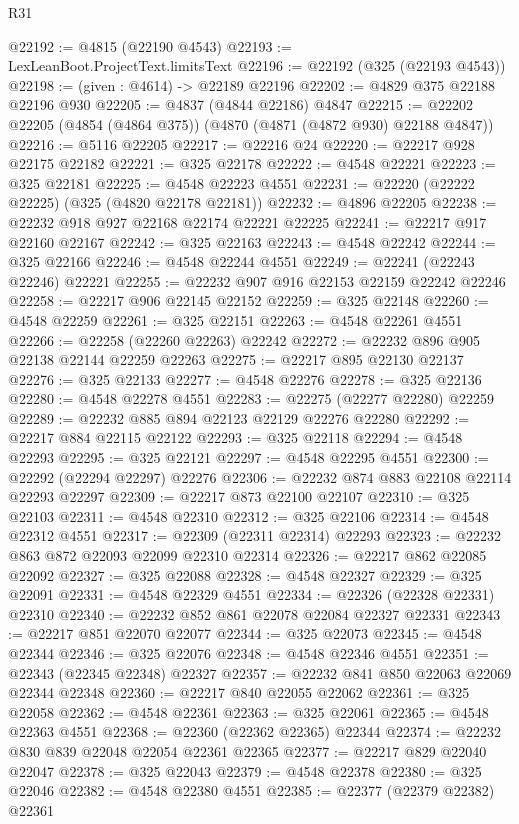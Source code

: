 \begin{lexlean}{R31}
\begin{coremodule}
@22192 := @4815 (@22190 @4543)
@22193 := LexLeanBoot.ProjectText.limitsText
@22196 := @22192 (@325 (@22193 @4543))
@22198 := (given : @4614) -> @22189 @22196
@22202 := @4829 @375 @22188 @22196 @930
@22205 := @4837 (@4844 @22186) @4847
@22215 := @22202 @22205 (@4854 (@4864 @375)) (@4870 (@4871 (@4872 @930) @22188 @4847))
@22216 := @5116 @22205
@22217 := @22216 @24
@22220 := @22217 @928 @22175 @22182
@22221 := @325 @22178
@22222 := @4548 @22221
@22223 := @325 @22181
@22225 := @4548 @22223 @4551
@22231 := @22220 (@22222 @22225) (@325 (@4820 @22178 @22181))
@22232 := @4896 @22205
@22238 := @22232 @918 @927 @22168 @22174 @22221 @22225
@22241 := @22217 @917 @22160 @22167
@22242 := @325 @22163
@22243 := @4548 @22242
@22244 := @325 @22166
@22246 := @4548 @22244 @4551
@22249 := @22241 (@22243 @22246) @22221
@22255 := @22232 @907 @916 @22153 @22159 @22242 @22246
@22258 := @22217 @906 @22145 @22152
@22259 := @325 @22148
@22260 := @4548 @22259
@22261 := @325 @22151
@22263 := @4548 @22261 @4551
@22266 := @22258 (@22260 @22263) @22242
@22272 := @22232 @896 @905 @22138 @22144 @22259 @22263
@22275 := @22217 @895 @22130 @22137
@22276 := @325 @22133
@22277 := @4548 @22276
@22278 := @325 @22136
@22280 := @4548 @22278 @4551
@22283 := @22275 (@22277 @22280) @22259
@22289 := @22232 @885 @894 @22123 @22129 @22276 @22280
@22292 := @22217 @884 @22115 @22122
@22293 := @325 @22118
@22294 := @4548 @22293
@22295 := @325 @22121
@22297 := @4548 @22295 @4551
@22300 := @22292 (@22294 @22297) @22276
@22306 := @22232 @874 @883 @22108 @22114 @22293 @22297
@22309 := @22217 @873 @22100 @22107
@22310 := @325 @22103
@22311 := @4548 @22310
@22312 := @325 @22106
@22314 := @4548 @22312 @4551
@22317 := @22309 (@22311 @22314) @22293
@22323 := @22232 @863 @872 @22093 @22099 @22310 @22314
@22326 := @22217 @862 @22085 @22092
@22327 := @325 @22088
@22328 := @4548 @22327
@22329 := @325 @22091
@22331 := @4548 @22329 @4551
@22334 := @22326 (@22328 @22331) @22310
@22340 := @22232 @852 @861 @22078 @22084 @22327 @22331
@22343 := @22217 @851 @22070 @22077
@22344 := @325 @22073
@22345 := @4548 @22344
@22346 := @325 @22076
@22348 := @4548 @22346 @4551
@22351 := @22343 (@22345 @22348) @22327
@22357 := @22232 @841 @850 @22063 @22069 @22344 @22348
@22360 := @22217 @840 @22055 @22062
@22361 := @325 @22058
@22362 := @4548 @22361
@22363 := @325 @22061
@22365 := @4548 @22363 @4551
@22368 := @22360 (@22362 @22365) @22344
@22374 := @22232 @830 @839 @22048 @22054 @22361 @22365
@22377 := @22217 @829 @22040 @22047
@22378 := @325 @22043
@22379 := @4548 @22378
@22380 := @325 @22046
@22382 := @4548 @22380 @4551
@22385 := @22377 (@22379 @22382) @22361

\end{coremodule}
\end{lexlean}
